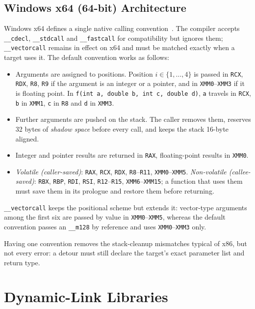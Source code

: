 \subsection{Windows x64 (64-bit) Architecture}
\label{subsec:abi_x64}
Windows x64 defines a single native calling convention~\cite{doc:msvc_x64_calling_conventions}.
The compiler accepts \texttt{\_\_cdecl}, \texttt{\_\_stdcall} and \texttt{\_\_fastcall} for compatibility but ignores them; \texttt{\_\_vectorcall} remains in effect on x64 and must be matched exactly when a target uses it.
The default convention works as follows:
\begin{itemize}
	\item Arguments are assigned to positions. Position $i\in\{1,\dots,4\}$ is passed in \texttt{RCX}, \texttt{RDX}, \texttt{R8}, \texttt{R9} if the argument is an integer or a pointer, and in \texttt{XMM0}--\texttt{XMM3} if it is floating point. In \texttt{f(int a, double b, int c, double d)}, \texttt{a} travels in \texttt{RCX}, \texttt{b} in \texttt{XMM1}, \texttt{c} in \texttt{R8} and \texttt{d} in \texttt{XMM3}.
	\item Further arguments are pushed on the stack. The caller removes them, reserves 32 bytes of \emph{shadow space} before every call, and keeps the stack 16-byte aligned.
	\item Integer and pointer results are returned in \texttt{RAX}, floating-point results in \texttt{XMM0}.
	\item \emph{Volatile (caller-saved)}: \texttt{RAX}, \texttt{RCX}, \texttt{RDX}, \texttt{R8}--\texttt{R11}, \texttt{XMM0}--\texttt{XMM5}. \emph{Non-volatile (callee-saved)}: \texttt{RBX}, \texttt{RBP}, \texttt{RDI}, \texttt{RSI}, \texttt{R12}--\texttt{R15}, \texttt{XMM6}--\texttt{XMM15}; a function that uses them must save them in its prologue and restore them before returning.
\end{itemize}

\texttt{\_\_vectorcall} keeps the positional scheme but extends it: vector-type arguments among the first six are passed by value in \texttt{XMM0}--\texttt{XMM5}, whereas the default convention passes an \texttt{\_\_m128} by reference and uses \texttt{XMM0}--\texttt{XMM3} only.

Having one convention removes the stack-cleanup mismatches typical of x86, but not every error: a detour must still declare the target's exact parameter list and return type.


\section{Dynamic-Link Libraries}
\label{sec:dll_foundations}

